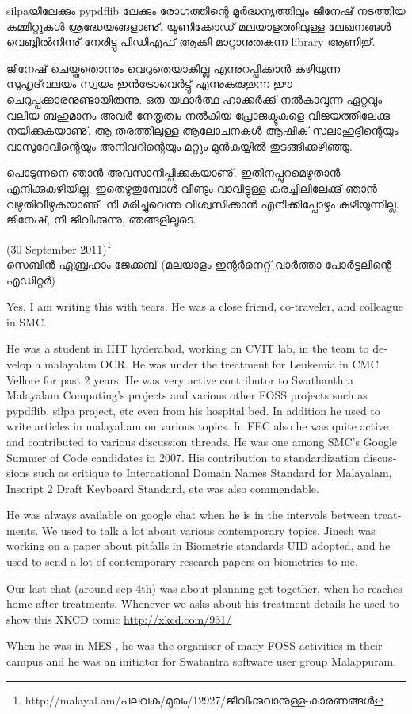 
silpaയിലേക്കും pypdflib ലേക്കും രോഗത്തിന്റെ മൂര്‍ദ്ധന്യത്തിലും ജിനേഷ് നടത്തിയ കമ്മിറ്റുകള്‍ ശ്രദ്ധേയങ്ങളാണു്. യൂണിക്കോഡ് 
മലയാളത്തിലുള്ള ലേഖനങ്ങള്‍ വെബ്ബില്‍നിന്നു് നേരിട്ടു പിഡിഎഫ് ആക്കി മാറ്റാനുതകുന്ന library ആണിതു്.

ജിനേഷ് ചെയ്തതൊന്നും വെറുതെയാകില്ല എന്നുറപ്പിക്കാന്‍ കഴിയുന്ന സുഹൃദ്‌വലയം സ്വയം ഇന്‍ട്രോവെര്‍ട്ടു് എന്നുകുരുതുന്ന 
ഈ ചെറുപ്പക്കാരനുണ്ടായിരുന്നു. ഒരു യഥാര്‍ത്ഥ ഹാക്കര്‍ക്കു് നല്‍കാവുന്ന ഏറ്റവും വലിയ ബഹുമാനം അവര്‍ നേതൃത്വം 
നല്‍കിയ പ്രോജക്ടുകളെ വിജയത്തിലേക്കു നയിക്കുകയാണു്. ആ തരത്തിലുള്ള ആലോചനകള്‍ ആഷിക്‍ സലാഹുദ്ദീന്റെയും 
വാസുദേവിന്റെയും അനിവറിന്റെയും മറ്റും മുന്‍കയ്യില്‍ തുടങ്ങിക്കഴിഞ്ഞു.

പൊടുന്നനെ ഞാന്‍ അവസാനിപ്പിക്കുകയാണു്. ഇതിനപ്പുറമെഴുതാന്‍ എനിക്കുകഴിയില്ല. ഇതെഴുതുമ്പോള്‍ വീണ്ടും വാവിട്ടുള്ള 
കരച്ചിലിലേക്കു് ഞാന്‍ വഴുതിവീഴുകയാണു്. നീ മരിച്ചുവെന്നു വിശ്വസിക്കാന്‍ എനിക്കിപ്പോഴും കഴിയുന്നില്ല. ജിനേഷ്, നീ ജീവിക്കുന്നു, 
ഞങ്ങളിലൂടെ.

(30  September 2011)\footnote{http://malayal.am/പലവക/മുഖം/12927/ജീവിക്കുവാനുള്ള-കാരണങ്ങള്‍}\\
സെബിന്‍ ഏബ്രഹാം ജേക്കബ് (മലയാളം ഇന്റര്‍നെറ്റ് വാര്‍ത്താ പോര്‍ട്ടലിന്റെ എഡിറ്റര്‍)

\newpage

{\vskip 2pt}
\begin{english}
Yes, I am writing this with tears. He was a close friend,
co-traveler, and colleague in SMC.

He was a student in IIIT hyderabad, working on CVIT lab, in the team
to develop a malayalam OCR. He was under the treatment for Leukemia in
CMC Vellore for past 2 years. He was very active contributor to
Swathanthra Malayalam Computing's projects and various other FOSS
projects such as pypdflib, silpa project, etc even from his hospital
bed. In addition he used to write articles in malayal.am on various
topics. In FEC also he was quite active and contributed to various
discussion threads. He was one among SMC's  Google Summer of Code
candidates in 2007. His contribution to standardization discussions
such as critique to International Domain Names Standard for Malayalam,
Inscript 2 Draft Keyboard Standard, etc was also commendable.

He was always available on google chat when he is in the intervals
between treatments. We used to talk a lot about various contemporary
topics. Jinesh was working on a paper about pitfalls in Biometric
standards UID adopted, and he used to send a lot of contemporary
research papers on biometrics to me.

Our last chat (around sep 4th) was about planning get together, when
he reaches home after treatments.
Whenever we asks about his treatment details he used to show this XKCD comic
\url{http://xkcd.com/931/}

When he was in MES , he was the organiser of many FOSS activities in
their campus and he was an initiator for Swatantra software user group
Malappuram.
\end{english}

